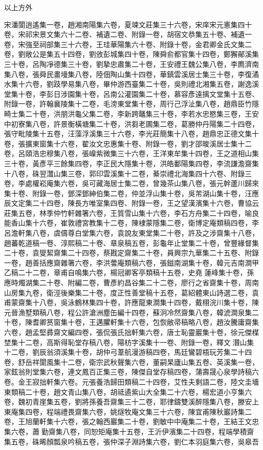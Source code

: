 \begin{pinyinscope}
以上方外

宋潘閬逍遙集一卷，趙湘南陽集六卷，夏竦文莊集三十六卷，宋庠宋元憲集四十卷，宋祁宋景文集六十二卷、補遺二卷、附錄一卷，胡宿文恭集五十卷、補遺一卷，宋強至祠部集三十六卷，王珪華陽集六十卷、附錄十卷，金君卿金氏文集二卷，劉敞公是集五十四卷，劉攽彭城集四十卷，陳舜俞都官集十四卷，鄭獬鄖溪集三十卷，呂陶凈德集三十卷，劉摯忠肅集二十卷，王安禮王魏公集八卷，李廌濟南集八卷，張舜民畫墁集八卷，陸佃陶山集十四卷，華鎮雲溪居士集三十卷，李復潏水集十六卷，劉跂學易集八卷，畢仲游西臺集二十卷，吳則禮北湘集五卷，謝逸溪堂集十卷，李彭日涉園集十卷，呂南公灌園集二十卷，慕容彥遠摛文堂集十五卷、附錄一卷，許翰襄陵集十二卷，毛滂東堂集十卷，周行己浮沚集八卷，趙鼎臣竹隱畸士集二十卷，洪朋洪龜父集二卷，李新跨鼇集三十卷，李若水忠愍集三卷，王安中初寮集八卷，許景衡橫塘集二十卷，洪芻老圃集二卷，葛勝仲丹陽集二十四卷，張守毗陵集十五卷，汪藻浮溪集三十六卷，李光莊簡集十八卷，趙鼎忠正德文集十卷，張擴東窗集十六卷，翟汝文忠惠集十卷、附錄一卷，劉才邵晙溪居士集十二卷，呂頤浩忠穆集八卷，張嵲紫微集三十六卷，王洋東牟集十四卷，王之道相山集三十卷，黃彥平三餘集四卷，李正民大隱集十卷，洪皓鄱陽集四卷，李流謙澹齋集十八卷，硃翌灊山集三卷，郭印雲溪集十二卷，綦崇禮北海集四十六卷、附錄三卷，李處權崧庵集六卷，吳可藏海居士集二卷，曾幾茶山集八卷，張元幹蘆川歸來集十卷、附錄一卷，鄧深鄧紳伯集二卷，仲並浮山集十卷，吳芾湖山集十卷，汪應辰文定集二十四卷，陳長方唯室集四卷、附錄一卷，王之望漢濱集十六卷，曹協云莊集五卷，林季仲竹軒雜箸六卷，王質雪山集十六卷，李石方舟集二十四卷，喻良能香山集十六卷，崔敦禮宮教集十二卷，陳棣蒙隱集二卷，衛博定庵類稿四卷，李呂澹軒集八卷，虞儔尊白堂集六卷，袁說友東堂集二十卷，許及之涉齋集十八卷，趙蕃乾道稿一卷、淳熙稿二十卷、章泉稿五卷，彭龜年止堂集二十卷，曾豐緣督集二十卷，袁燮絜齋集二十四卷，蔡戡定齋集二十卷，員興宗九華集二十五卷、附錄一卷，趙善括應齋雜箸六卷，李洪蕓庵類稿六卷，張鎡南湖集十卷，韓元吉南澗甲乙稿二十二卷，章甫自鳴集六卷，楊冠卿客亭類稿十五卷，史堯蓮峰集十卷，孫應時燭湖集二十卷、附編二卷，曹彥約昌谷集二十二卷，廖行之省齋集十卷，周南山房集九卷，衛涇後樂集二十卷，度正性善堂稿十五卷，葛紹體東山詩選二卷，袁甫蒙齋集十八卷，吳泳鶴林集四十卷，許應龍東澗集十四卷，戴栩浣川集十卷，陳元晉漁墅類稿八卷，程公許滄洲塵缶編十四卷，蘇泂冷然齋集八卷，韓淲澗泉集二十卷，陳耆卿筼窗集十卷，王邁臞軒集十六卷，包恢敝帚稿略八卷，趙汝騰庸齋集六卷，趙孟堅彞齋文編四卷，張侃張氏拙軒集六卷，唐士恥靈巖集十卷，徐元傑楳埜集十二卷，高斯得恥堂存稿八卷，陽枋字溪集十一卷、附錄一卷，釋文潛山集十二卷，劉辰翁須溪集十卷，胡仲弓葦航漫游稿四卷，馬廷鸞碧梧玩芳集二十四卷，舒岳祥閬風集十二卷，衛宗武秋聲集六卷，董嗣杲廬山集五卷、英溪集一卷，家鉉翁則堂集六卷，連文鳳百正集三卷，陳傑自堂存稿四卷，蒲壽晟心泉學詩稿六卷。金王寂拙軒集六卷。元張養浩歸田類稿二十四卷，艾性夫剩語二卷，陸文圭墻東類稿二十卷，趙文青山集八卷，胡祗遹紫山大全集二十六卷，楊宏道小亨集六卷，魏初青崖集五卷，劉將孫養吾齋集三十二卷，耶律鑄雙溪醉隱集八卷，滕安上東庵集四卷，程端禮畏齋集六卷，姚燧牧庵文集三十六卷，陳宜甫陳秋巖詩集二卷，王旭蘭軒集十六卷，張之翰西巖集二十卷，劉敏中中庵集二十卷，王結王文忠集六卷，蕭勤齋集八卷，同恕矩庵集十五卷，王沂伊濱集二十四卷，程端學積齋集五卷，硃晞顏瓢泉吟稿五卷，張仲深子淵詩集六卷，劉仁本羽庭集六卷，吳皋吾
\end{pinyinscope}
